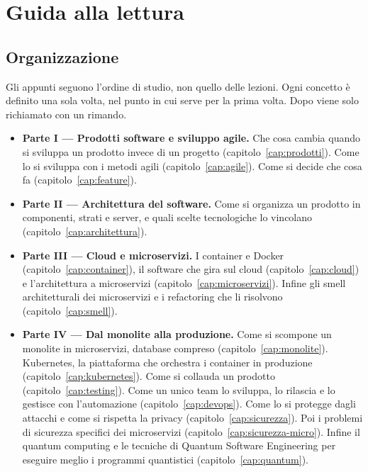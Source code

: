\chapter{Guida alla lettura}

\section*{Organizzazione}

Gli appunti seguono l'ordine di studio, non quello delle lezioni. Ogni concetto è definito una sola volta, nel
punto in cui serve per la prima volta. Dopo viene solo richiamato con un rimando.

\begin{itemize}
  \item \textbf{Parte I --- Prodotti software e sviluppo agile.} Che cosa cambia quando si sviluppa un prodotto
    invece di un progetto (capitolo~\ref{cap:prodotti}). Come lo si sviluppa con i metodi agili
    (capitolo~\ref{cap:agile}). Come si decide che cosa fa (capitolo~\ref{cap:feature}).
  \item \textbf{Parte II --- Architettura del software.} Come si organizza un prodotto in componenti, strati e
    server, e quali scelte tecnologiche lo vincolano (capitolo~\ref{cap:architettura}).
  \item \textbf{Parte III --- Cloud e microservizi.} I container e Docker (capitolo~\ref{cap:container}), il software
    che gira sul cloud (capitolo~\ref{cap:cloud}) e l'architettura a microservizi (capitolo~\ref{cap:microservizi}).
    Infine gli smell architetturali dei microservizi e i refactoring che li risolvono (capitolo~\ref{cap:smell}).
  \item \textbf{Parte IV --- Dal monolite alla produzione.} Come si scompone un monolite in microservizi, database
    compreso (capitolo~\ref{cap:monolite}). Kubernetes, la piattaforma che orchestra i container in produzione
    (capitolo~\ref{cap:kubernetes}). Come si collauda un prodotto (capitolo~\ref{cap:testing}). Come un unico team lo
    sviluppa, lo rilascia e lo gestisce con l'automazione (capitolo~\ref{cap:devops}). Come lo si protegge dagli attacchi
    e come si rispetta la privacy (capitolo~\ref{cap:sicurezza}). Poi i problemi di sicurezza specifici dei
    microservizi (capitolo~\ref{cap:sicurezza-micro}). Infine il quantum computing e le tecniche di Quantum Software
    Engineering per eseguire meglio i programmi quantistici (capitolo~\ref{cap:quantum}).
\end{itemize}

